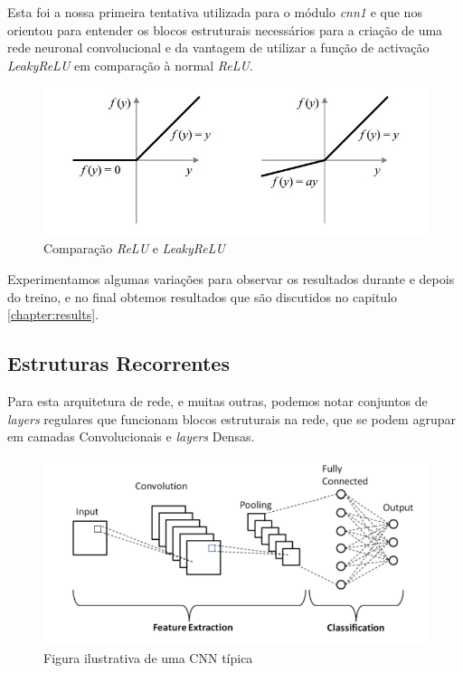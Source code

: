 \documentclass[a4paper]{report}
\begin{document}
Esta foi a nossa primeira tentativa utilizada para o módulo \textit{cnn1} e que nos
orientou para entender os blocos estruturais necessários para a criação de uma rede
neuronal convolucional e da vantagem de utilizar a função de activação \textit{LeakyReLU}
em comparação à normal \textit{ReLU}.

\begin{figure}[h]
    \centering
    \includegraphics[scale=0.5]{images/relu_cmp.jpeg}
    \caption{Comparação \textit{ReLU} e \textit{LeakyReLU}}
    \label{fig:relu_cmp}
\end{figure}

Experimentamos algumas variações para observar os resultados durante e depois do
treino, e no final obtemos resultados que são discutidos no capitulo
\ref{chapter:results}.

\pagebreak
\subsection{Estruturas Recorrentes}

Para esta arquitetura de rede, e muitas outras, podemos notar conjuntos de
\textit{layers} regulares que funcionam blocos estruturais na rede, que se podem agrupar
em camadas Convolucionais e \textit{layers} Densas.

\begin{figure}[h]
    \centering
    \includegraphics[scale=0.5]{images/layers.png}
    \caption{Figura ilustrativa de uma CNN típica}
\end{figure}
\end{document}
